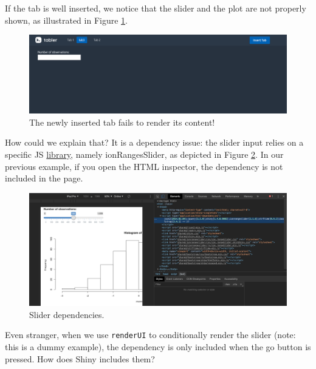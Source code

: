 \documentclass[
]{book}
\begin{document}
If the tab is well inserted, we notice that the slider and the plot are not properly shown, as illustrated in Figure \ref{fig:tabler-insert-tab-fail}.

\begin{figure}
\includegraphics[width=14.99in]{images/practice/tabler-insert-tab-fail} \caption{The newly inserted tab fails to render its content!}\label{fig:tabler-insert-tab-fail}
\end{figure}

How could we explain that? It is a dependency issue: the slider input relies on a specific JS \href{http://ionden.com/a/plugins/ion.rangeSlider/}{library}, namely ionRangesSlider, as depicted in Figure \ref{fig:slider-deps}. In our previous example, if you open the HTML inspector, the dependency is not included in the page.

\begin{figure}
\includegraphics[width=36.03in]{images/practice/slider-deps} \caption{Slider dependencies.}\label{fig:slider-deps}
\end{figure}

Even stranger, when we use \texttt{renderUI} to conditionally render the slider (note: this is a dummy example), the dependency is only included when the go button is pressed. How does Shiny includes them?
\end{document}
